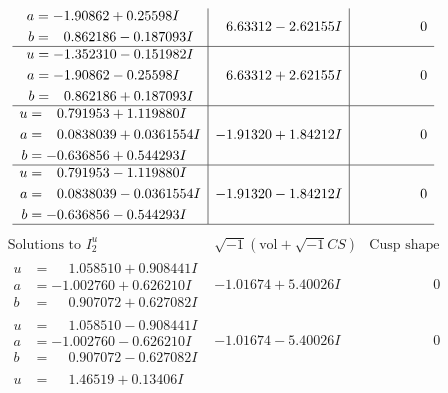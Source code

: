 \documentclass[1p]{elsarticle_modified}
\theoremstyle{definition}
\newcommand{\I}{\sqrt{-1}}
\begin{document}
$$\begin{array}{c|c|c}
\begin{aligned}
a &= -1.90862 + 0.25598 I \\
b &= \phantom{-}0.862186 - 0.187093 I\end{aligned}
 & \phantom{-}6.63312 - 2.62155 I & \phantom{-0.000000 } 0 \\ \hline\begin{aligned}
u &= -1.352310 - 0.151982 I \\
a &= -1.90862 - 0.25598 I \\
b &= \phantom{-}0.862186 + 0.187093 I\end{aligned}
 & \phantom{-}6.63312 + 2.62155 I & \phantom{-0.000000 } 0 \\ \hline\begin{aligned}
u &= \phantom{-}0.791953 + 1.119880 I \\
a &= \phantom{-}0.0838039 + 0.0361554 I \\
b &= -0.636856 + 0.544293 I\end{aligned}
 & -1.91320 + 1.84212 I & \phantom{-0.000000 } 0 \\ \hline\begin{aligned}
u &= \phantom{-}0.791953 - 1.119880 I \\
a &= \phantom{-}0.0838039 - 0.0361554 I \\
b &= -0.636856 - 0.544293 I\end{aligned}
 & -1.91320 - 1.84212 I & \phantom{-0.000000 } 0\\
 \hline 
 \end{array}$$\newpage$$\begin{array}{c|c|c}  
\text{Solutions to }I^u_{2}& \I (\text{vol} + \sqrt{-1}CS) & \text{Cusp shape}\\
 \hline 
\begin{aligned}
u &= \phantom{-}1.058510 + 0.908441 I \\
a &= -1.002760 + 0.626210 I \\
b &= \phantom{-}0.907072 + 0.627082 I\end{aligned}
 & -1.01674 + 5.40026 I & \phantom{-0.000000 } 0 \\ \hline\begin{aligned}
u &= \phantom{-}1.058510 - 0.908441 I \\
a &= -1.002760 - 0.626210 I \\
b &= \phantom{-}0.907072 - 0.627082 I\end{aligned}
 & -1.01674 - 5.40026 I & \phantom{-0.000000 } 0 \\ \hline\begin{aligned}
u &= \phantom{-}1.46519 + 0.13406 I \\

\end{aligned}
\end{array}$$
\end{document}
